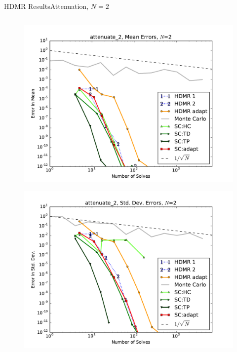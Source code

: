 \documentclass{beamer}
\begin{document}
\begin{frame}{HDMR Results}{Attenuation, $N=2$}
\begin{columns}
\begin{column}{0.5\textwidth}
\begin{figure}[h!]
          \includegraphics[width=0.8\linewidth]{anlmodels/attenuate_2_mean_errs}
        \end{figure}
        \vspace{-20pt}
        \begin{figure}[h!]
          \centering
          \includegraphics[width=0.8\linewidth]{anlmodels/attenuate_2_variance_errs}
        \end{figure}
   \end{column}
 \end{columns}
\end{frame}
\end{document}
